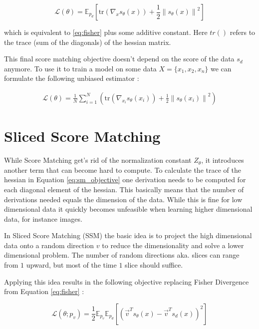 \begin{equation}
    \mathcal{L}(\theta) = \mathbb{E}_{p_d} \left[\text{tr} \left( \nabla_x s_\theta(x) \right) + \frac{1}{2} \left\| s_\theta(x) \right\|^2 \right]
\end{equation}

which is equivalent to \ref{eq:fisher} plus some additive constant. Here $tr()$ refers to the
trace (sum of the diagonals) of the hessian matrix.
 
This final score matching objective doesn't depend on the score of the data $s_d$ anymore. To use it to train a model on some 
data $X = \{x_1, x_2, x_n\}$ we can formulate the following unbiased estimator \cite{sm}: 

\begin{align}
    \label{eq:sm_objective}
    \mathcal{L}(\theta) = \frac{1}{N} \sum_{i=1}^{N} \left(\text{tr} \left( \nabla_{x_i} s_\theta(x_i) \right) + \frac{1}{2} \left\| s_\theta(x_i) \right\|^2 \right)
\end{align}

\section{Sliced Score Matching}
\label{sec:ssm}

While Score Matching get's rid of the normalization constant $Z_\theta$, it introduces another term that can become hard
to compute. To calculate the trace of the hessian in Equation \ref{eq:sm_objective} one derivation needs to be computed for each diagonal element of the hessian.
This basically means that the number of derivations needed equals the dimension of the data. 
While this is fine for low dimensional data it quickly becomes unfeasible when
learning higher dimensional data, for instance images.  

In Sliced Score Matching (SSM) \cite{ssm} the basic idea is to project the high dimensional data onto a random direction $v$ to reduce 
the dimensionality and solve a lower dimensional problem. The number of random directions aka. slices can range from $1$ upward, but 
most of the time $1$ slice should suffice. 

Applying this idea results in the following objective replacing Fisher Divergence from Equation \ref{eq:fisher} \cite{ssm}: 

\begin{equation}
    \label{eq:ssm}
    \mathcal{L}(\theta; p_v) = \frac{1}{2} \mathbb{E}_{p_v} \mathbb{E}_{p_d} \left[ \left( \vec{v}^T s_\theta(x) - \vec{v}^T s_d(x) \right)^2 \right]
\end{equation}


